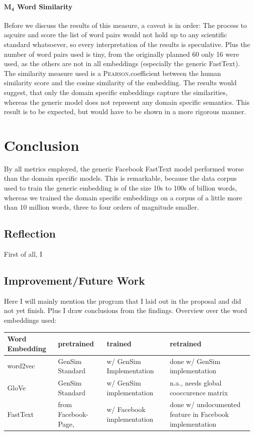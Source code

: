 \documentclass[10pt,a4paper]{article}
\begin{document}
\paragraph{$\boldsymbol{M_4}$ Word Similarity} Before we discuss the results of this measure, a caveat is in order: The process to aqcuire and score the list of word pairs would not hold up to any scientific standard whatsoever, so every interpretation of the results is speculative. Plus the number of word pairs used is tiny, from the originally planned 60 only 16 were used, as the others are not in all embeddings (especially the generic FastText). 
The similarity measure used is a \textsc{Pearson}.coefficient between the human similarity score and the cosine similarity of the embedding. 
The results would suggest, that only the domain specific embeddings capture the similarities, whereas the generic model does not represent any domain specific semantics. This result is to be expected, but would have to be shown in a more rigorous manner.  




\section{Conclusion}
	
By all metrics employed, the generic Facebook FastText model performed worse than the domain specific models. This is remarkable, because the data corpus used to train the generic embedding	is of the size 10s to 100s of billion words, whereas we trained the domain specific embeddings on a corpus of a little more than 10 million words, three to four orders of magnitude smaller.
	
	\subsection{Reflection}
	
	First of all, I 
	
	\subsection{Improvement/Future Work}
	Here I will mainly mention the program that I laid out in the proposal and did not yet finish. Plus I draw conclusions from the findings.
		Overview over the word embeddings used:
	\begin{center}
		\begin{tabular}{|l|p{3cm}| p{3cm}| p{3cm}|}
			\hline
			\textbf{Word Embedding} & pretrained & trained & retrained \\ 
			\hline
			word2vec  & GenSim Standard & w/ GenSim Implementation & done w/ GenSim implementation \\  
			\hline
			GloVe & GenSim Standard &w/ GenSim implementation & n.a., needs global cooccurence matrix \\  
			\hline
			FastText & from Facebook-Page,  & w/ Facebook implementation & done w/ undocumented feature in Facebook implementation\\
			\hline
      \end{tabular}	
\end{center}
\end{document}
